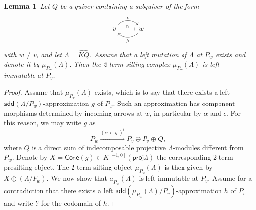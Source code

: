 \documentclass[11pt]{amsart}
\newcommand{\add}{\mathsf{add}}
\newcommand{\proj}{\mathsf{proj}}
\newcommand{\cone}{\mathsf{Cone}}
\newtheorem{lemma}[theorem]{Lemma}
\theoremstyle{definition}
\begin{document}
\begin{lemma}\label{lem:mutprobAtilde}
	Let $Q$ be a quiver containing a subquiver of the form 
	\[ \begin{tikzcd}  v \arrow[r, "\alpha"] \arrow[r, bend left=50, "\epsilon"] & w \arrow[l, bend left=50, "\beta"] \end{tikzcd} \]
	with $w\neq v$, and let $\Lambda = \widehat{KQ}$. Assume that a left mutation of $\Lambda$ at $P_w$ exists and denote it by $\mu_{P_w}(\Lambda)$. Then the 2-term silting complex $\mu_{P_w}(\Lambda)$ is left immutable at $P_v$. 
\end{lemma}
\begin{proof}
	Assume that $\mu_{P_w}(\Lambda)$ exists, which is to say that there exists a left $\add(\Lambda/P_w)$-approximation $g$ of $P_w$. Such an approximation has component morphisms determined by incoming arrows at $w$, in particular by $\alpha$ and $\epsilon$. For this reason, we may write $g$ as
	\[
	P_w \xrightarrow{(\alpha \phantom{x} \epsilon \phantom{x} g')^t} P_v \oplus P_v \oplus Q,
	\]
	where $Q$ is a direct sum of indecomposable projective $\Lambda$-modules different from $P_w$. Denote by $X = \cone(g) \in K^{[-1,0]}(\proj \Lambda)$ the corresponding 2-term presilting object. The 2-term silting object $\mu_{P_w}(\Lambda)$ is then given by $X \oplus (\Lambda/P_w)$. We now show that $\mu_{P_w}(\Lambda)$ is left immutable at $P_v$. Assume for a contradiction that there exists a left $\add(\mu_{P_w}(\Lambda)/P_v)$-approximation $h$ of $P_v$ and write $Y$ for the codomain of $h$. 
	

\end{proof}
\end{document}
